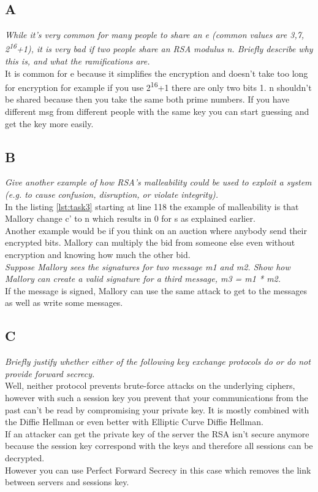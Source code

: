 \subsection{A}
\textit{While it's very common for many people to share an e (common values are 3,7, 2\textsuperscript{16}+1), it is very bad if two people share an RSA modulus n. Briefly describe why this is, and what the ramifications are.}\\
It is common for e because it simplifies the encryption and doesn't take too long for encryption for example if you use 2\textsuperscript{16}+1 there are only two bits 1. n shouldn't be shared because then you take the same both prime numbers. If you have different msg from different people with the same key you can start guessing and get the key more easily.\\

\subsection{B}
\textit{Give another example of how RSA’s malleability could be used to exploit a system (e.g. to cause confusion, disruption, or violate integrity).}\\
In the listing \ref{lst:task3} starting at line 118 the example of malleability is that Mallory change c' to n which results in 0 for s as explained earlier.\\
Another example would be if you think on an auction where anybody send their encrypted bits. Mallory can multiply the bid from someone else even without encryption and knowing how much the other bid.\\

\textit{Suppose Mallory sees the signatures for two message m1 and m2.  Show how Mallory can create a valid signature for a third message, m3 = m1 * m2.}\\
If the message is signed, Mallory can use the same attack to get to the messages as well as write some messages.\\

\subsection{C}
\textit{Briefly justify whether either of the following key exchange protocols do or do not provide forward secrecy.}\\
Well, neither protocol prevents brute-force attacks on the underlying ciphers, however with such a session key you prevent that your communications from the past can't be read by compromising your private key. It is mostly combined with the Diffie Hellman or even better with Elliptic Curve Diffie Hellman.\\
If an attacker can get the private key of the server the RSA isn't secure anymore because the session key correspond with the keys and therefore all sessions can be decrypted.\\
However you can use Perfect Forward Secrecy in this case which removes the link between servers and sessions key.


